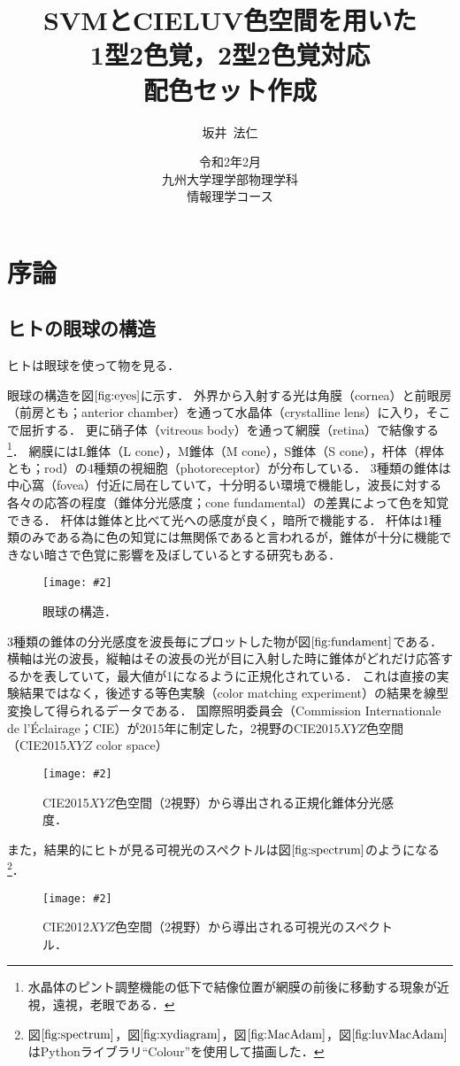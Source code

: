 \documentclass[uplatex,paper=a4,fontsize=4.0truemm,jafontsize=4.0truemm,head_space=30.0truemm,foot_space=30.0truemm,baselineskip=8.0truemm,line_length=40zw,gutter=25.0truemm,oneside,openany,fleqn,hanging_panctuation,open_bracket_pos=nibu_tentsuki,dvipdfmx,jis2004,book,titlepage]{jlreq}
\title{\vspace{-25truemm}\Huge{SVMとCIELUV色空間を用いた\\1型2色覚，2型2色覚対応\\配色セット作成}\vspace{55truemm}}
\author{\huge{坂井~法仁}}
\date{\LARGE{令和2年2月}\\ \vspace{30truemm}\LARGE{九州大学理学部物理学科\\ 情報理学コース}}
\theoremstyle{mystyle}
\newcommand{\captiondot}[1]{\caption{#1．}}
\newcommand{\figureinput}[4]{\begin{figure}[btp]\centering\texttt{[image: \#2]}\captiondot{#3}\label{fig:#4}\end{figure}}
\newcommand{\mathdisplaystyle}[1]{\(\displaystyle{#1}\)}
\newcommand{\Reference}[1]{\mathdisplaystyle{\ref{#1}}}
\begin{document}
	\maketitle
	\tableofcontents
	\clearpage
	\setcounter{page}{1}
	\chapter{序論}\label{chap:intro}
		\section{ヒトの眼球の構造}
			ヒトは眼球を使って物を見る．

			眼球の構造を図\Reference{fig:eyes}に示す．
			外界から入射する光は角膜（cornea）と前眼房（前房とも；anterior chamber）を通って水晶体（crystalline lens）に入り，そこで屈折する．
			更に硝子体（vitreous body）を通って網膜（retina）で結像する\footnote{水晶体のピント調整機能の低下で結像位置が網膜の前後に移動する現象が近視，遠視，老眼である．}．
			網膜にはL錐体（L cone），M錐体（M cone），S錐体（S cone），杆体（桿体とも；rod）の4種類の視細胞（photoreceptor）が分布している．
			3種類の錐体は中心窩（fovea）付近に局在していて，十分明るい環境で機能し，波長に対する各々の応答の程度（錐体分光感度；cone fundamental）の差異によって色を知覚できる．
			杆体は錐体と比べて光への感度が良く，暗所で機能する\cite{Hosoki2014}．
			杆体は1種類のみである為に色の知覚には無関係であると言われるが，錐体が十分に機能できない暗さで色覚に影響を及ぼしているとする研究もある\cite{Takeshita2014}．
			\figureinput{width=9.5truecm}{D:/a/figs/eye2.png}{眼球の構造\protect\cite[図-1]{Sotoyama1985}}{eyes}

			3種類の錐体の分光感度を波長毎にプロットした物が図\Reference{fig:fundament}である．
			横軸は光の波長，縦軸はその波長の光が目に入射した時に錐体がどれだけ応答するかを表していて，最大値が1になるように正規化されている．
			これは直接の実験結果ではなく，後述する等色実験（color matching experiment）の結果を線型変換して得られるデータである．
			国際照明委員会（Commission Internationale de l'Éclairage；CIE）が2015年に制定した，2\textdegree 視野のCIE2015\mathdisplaystyle{XYZ}色空間（CIE2015\mathdisplaystyle{XYZ} color space）
			\figureinput{width=\linewidth}{D:/a/figs/ConeFundamental.png}{CIE2015\mathdisplaystyle{XYZ}色空間（2\textdegree 視野）から導出される正規化錐体分光感度}{fundament}
			また，結果的にヒトが見る可視光のスペクトルは図\Reference{fig:spectrum}のようになる\footnote{図\Reference{fig:spectrum}，図\Reference{fig:xydiagram}，図\Reference{fig:MacAdam}，図\Reference{fig:luvMacAdam}はPythonライブラリ``Colour''を使用して描画した．}．
			\figureinput{width=10truecm}{D:/a/figs/spectrum.png}{CIE2012\mathdisplaystyle{XYZ}色空間（2\textdegree 視野）から導出される可視光のスペクトル}{spectrum}
\end{document}
